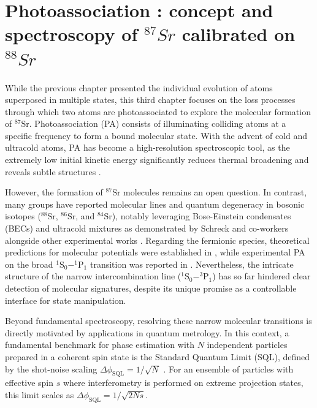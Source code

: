 ﻿
\chapter{Photoassociation : concept and spectroscopy of $^{87}Sr$ calibrated on $^{88}Sr$}
\label{chap 3}
\newcommand{\PATheoryFigDir}{Chapitres/Engineering highly entangled system of photoassociated 87Sr atoms/images/Figures_pour_theorie/}
\newcommand{\PATheoryFig}[1]{\PATheoryFigDir#1}

While the previous chapter presented the individual evolution of atoms superposed in multiple states, this third chapter focuses on the loss processes through which two atoms 
are photoassociated to explore the molecular formation of $^{87}\text{Sr}$.
Photoassociation (PA) consists of illuminating colliding atoms at a specific frequency to form a bound molecular state. With the advent of cold and ultracold atoms, PA has 
become a high-resolution spectroscopic tool, as the extremely low initial kinetic energy significantly reduces thermal broadening and reveals subtle structures 
\cite{jones_ultracold_2006}.

However, the formation of $^{87}\text{Sr}$ molecules remains an open question. In contrast, many groups have reported molecular lines and quantum degeneracy in bosonic isotopes
 ($^{88}\text{Sr}$, $^{86}\text{Sr}$, and $^{84}\text{Sr}$), notably leveraging Bose-Einstein condensates (BECs) and ultracold mixtures as demonstrated by Schreck and co-workers
  \cite{Stellmer2011Fermi} alongside other experimental works \cite{reschovsky_narrow-line_2018, zelevinsky_narrow_2006, blatt_measurement_2011, borkowski_mass_2014}.
Regarding the fermionic species, theoretical predictions for molecular potentials were established in \cite{stein_1s1s_2010}, while experimental PA on the broad $^1\text{S}_0 
- ^1\text{P}_1$ transition was reported in \cite{hill_photoassociative_2021}. Nevertheless, the intricate structure of the narrow intercombination line ($^1\text{S}_0 
- ^3\text{P}_1$) has so far hindered clear detection of molecular signatures, despite its unique promise as a controllable interface for state manipulation.

Beyond fundamental spectroscopy, resolving these narrow molecular transitions is directly motivated by applications in quantum metrology. In this context, a fundamental 
benchmark for phase estimation with $N$ independent particles prepared in a coherent spin state is the Standard Quantum Limit (SQL), defined by the shot-noise scaling $\Delta\phi_{\text{SQL}} = 
1/\sqrt{N}$ \cite{pezze_quantum_2014}. For an ensemble of particles with effective spin $s$ where interferometry is performed on extreme projection states, this limit scales as $\Delta\phi_{\text{SQL}} = 
1/\sqrt{2Ns}$.

